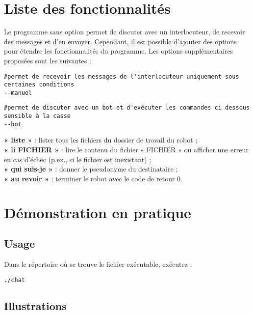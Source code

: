 \documentclass{article}
\begin{document}
\section{Liste des fonctionnalités}
\label{liste-des-fonctionnalites}

Le programme sans option permet de discuter avec un interlocuteur, de recevoir des messages et d'en envoyer.
Cependant, il est possible d'ajouter des options pour étendre les fonctionnalités du programme.
Les options supplémentaires proposées sont les suivantes :

\begin{verbatim}
#permet de recevoir les messages de l'interlocuteur uniquement sous certaines conditions
--manuel
\end{verbatim}


\begin{verbatim}
#permet de discuter avec un bot et d'exécuter les commandes ci dessous sensible à la casse
--bot
\end{verbatim}


\noindent \textbf{« liste »} : lister tous les fichiers du dossier de travail du robot ;\\
\textbf{« li FICHIER »} : lire le contenu du fichier « FICHIER » ou afficher une erreur en cas d’échec (p.ex., si le fichier est inexistant) ;\\
\textbf{« qui suis-je »} : donner le pseudonyme du destinataire ;\\
\textbf{« au revoir »} : terminer le robot avec le code de retour 0.\\

\section{Démonstration en pratique}
\label{demonstration-en-pratique}   


\subsection{Usage}
\label{usage}

Dans le répertoire où se trouve le fichier exécutable, exécutez :
\begin{verbatim}
./chat
\end{verbatim}


\subsection{Illustrations}
\label{illustrations}
\end{document}
